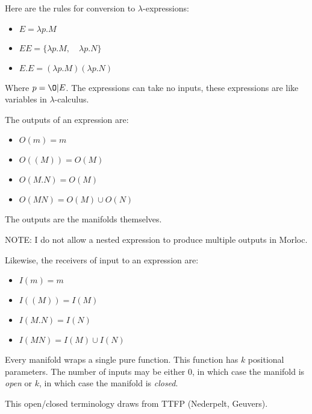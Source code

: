 \documentclass[12pt]{article}
\begin{document}
Here are the rules for conversion to $\lambda$-expressions:

\begin{itemize}
  \item $E = \lambda p . M$
  \item $EE = \{ \lambda p . M, \quad \lambda p . N \}$
  \item $E.E = ( \lambda p . M ) ( \lambda p . N )$
\end{itemize}

Where $p = \O | E$. The expressions can take no inputs, these expressions are
like variables in $\lambda$-calculus.

The outputs of an expression are:

\begin{itemize}
  \item $O(m) = m$
  \item $O( (M) ) = O(M)$
  \item $O(M.N) = O(M)$
  \item $O(MN) = O(M) \cup O(N)$
\end{itemize}

The outputs are the manifolds themselves.

NOTE: I do not allow a nested expression to produce multiple outputs in Morloc.

Likewise, the receivers of input to an expression are:

\begin{itemize}
  \item $I(m) = m$
  \item $I( (M) ) = I(M)$
  \item $I(M.N) = I(N)$
  \item $I(MN) = I(M) \cup I(N)$
\end{itemize}

Every manifold wraps a single pure function. This function has $k$ positional
parameters. The number of inputs may be either 0, in which case the manifold is
\textit{open} or $k$, in which case the manifold is \textit{closed}.

This open/closed terminology draws from TTFP (Nederpelt, Geuvers).
\end{document}
